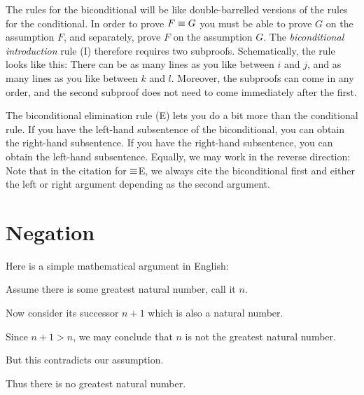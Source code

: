 The rules for the biconditional will be like double-barrelled versions of the rules for the conditional.
In order to prove $F \equiv G$  you must be able to prove $G$ on the assumption $F$, and separately, prove $F$ on the assumption $G$.
The \textit{biconditional introduction} rule ({\eiff}I) therefore requires two subproofs.
Schematically, the rule looks like this: 
There can be as many lines as you like between $i$ and $j$, and as many lines as you like between $k$ and $l$.
Moreover, the subproofs can come in any order, and the second subproof does not need to come immediately after the first.

The biconditional elimination rule ({\eiff}E) lets you do a bit more than the conditional rule.
If you have the left-hand subsentence of the biconditional, you can obtain the right-hand subsentence.
If you have the right-hand subsentence, you can obtain the left-hand subsentence.
Equally, we may work in the reverse direction:
Note that in the citation for $\equiv$E, we always cite the biconditional first and either the left or right argument depending as the second argument.



\section{Negation}
Here is a simple mathematical argument in English:
\begin{earg}
\item[] Assume there is some greatest natural number, call it $n$.
\item[] Now consider its successor $n+1$ which is also a natural number.
\item[] Since $n+1 > n$, we may conclude that $n$ is not the greatest natural number. 
\item[] But this contradicts our assumption. 
\item[\therefore] Thus there is no greatest natural number.
\end{earg}

